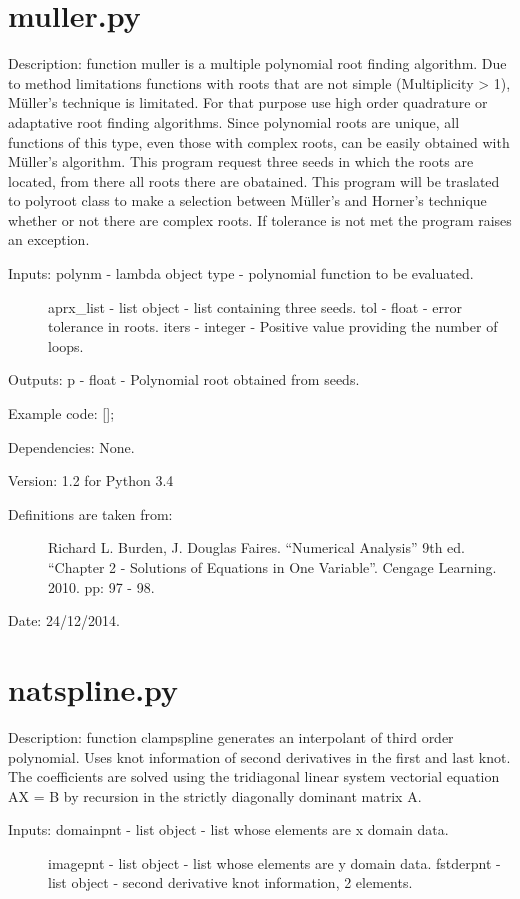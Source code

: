 \documentclass[letterpaper,10pt,oneside]{sphinxmanual}
\theoremstyle{plain}%
\theoremstyle{definition}%
\theoremstyle{remark}%
\begin{document}
\section{muller.py}
\label{code:module-muller}\label{code:muller-py}
Description: function muller is a multiple polynomial root finding algorithm.
Due to method limitations functions with roots that are not simple
(Multiplicity \textgreater{} 1), Müller's technique is limitated. For that purpose use
high order quadrature or adaptative root finding algorithms. Since polynomial
roots are unique, all functions of this type, even those with complex roots,
can be easily obtained with Müller's algorithm. This program request
three seeds in which the roots are located, from there all roots there are
obatained. This program will be traslated to polyroot class to make a
selection between  Müller's and Horner's technique whether or not there are
complex roots. If tolerance is not met the program raises an exception.
\begin{description}
\item[{Inputs: polynm - lambda object type - polynomial function to be evaluated.}] \leavevmode
aprx\_list - list object - list containing three seeds.
tol - float - error tolerance in roots.
iters - integer - Positive value providing the number of loops.

\end{description}

Outputs: p - float - Polynomial root obtained from seeds.

Example code: {[}{]};

Dependencies: None.

Version: 1.2 for Python 3.4
\begin{description}
\item[{Definitions are taken from:}] \leavevmode
Richard L. Burden, J. Douglas Faires. ``Numerical Analysis'' 9th ed.
``Chapter 2 - Solutions of Equations in One Variable''. 
Cengage Learning. 2010. pp: 97 - 98.

\end{description}




Date: 24/12/2014.


\section{natspline.py}
\label{code:module-natspline}\label{code:natspline-py}
Description: function clampspline generates an interpolant of third order 
polynomial. Uses knot information of second derivatives in the first and last
knot. The coefficients are solved using the tridiagonal linear system 
vectorial equation AX = B by recursion in the strictly diagonally dominant 
matrix A.
\begin{description}
\item[{Inputs: domainpnt - list object - list whose elements are x domain data.}] \leavevmode
imagepnt - list object - list whose elements are y domain data.
fstderpnt - list object - second derivative knot information, 2 elements.

\end{description}
\end{document}
